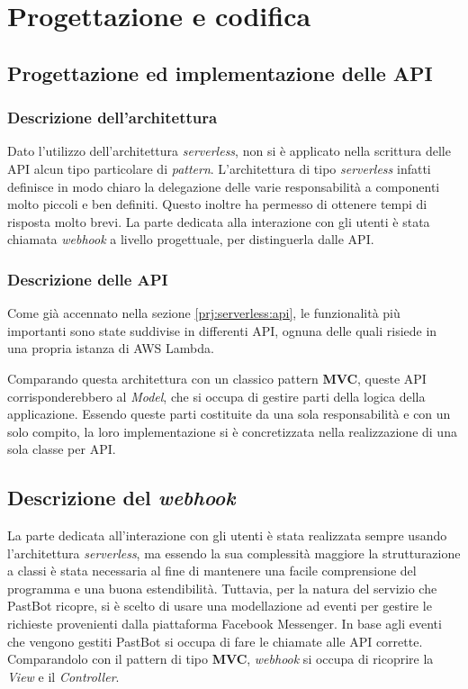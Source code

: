 
%
%

\chapter{Progettazione e codifica}

\section{Progettazione ed implementazione delle API}

\subsection{Descrizione dell'architettura}

Dato l'utilizzo dell'architettura \textit{serverless}, non si è applicato nella
scrittura delle API alcun tipo particolare di \textit{pattern}. L'architettura
di tipo \textit{serverless} infatti definisce in modo chiaro la delegazione
delle varie responsabilità a componenti molto piccoli e ben definiti. Questo
inoltre ha permesso di ottenere tempi di risposta molto brevi.
La parte dedicata alla interazione con gli utenti è stata chiamata
\textit{webhook} a livello progettuale, per distinguerla dalle API.

\subsection{Descrizione delle API}
Come già accennato nella sezione \ref{prj:serverless:api}, le funzionalità più
importanti sono state suddivise in differenti API, ognuna delle quali risiede
in una propria istanza di AWS Lambda.

Comparando questa architettura con un classico pattern \textbf{MVC}, queste API
corrisponderebbero al \textit{Model}, che si occupa di gestire parti della
logica della applicazione. Essendo queste parti costituite da una sola
responsabilità e con un solo compito, la loro implementazione si è
concretizzata nella realizzazione di una sola classe per API.

\section{Descrizione del \textit{webhook}}
La parte dedicata all'interazione con gli utenti è stata realizzata sempre
usando l'architettura \textit{serverless}, ma essendo la sua complessità
maggiore la strutturazione a classi è stata necessaria al fine di mantenere una
facile comprensione del programma e una buona estendibilità. Tuttavia, per la
natura del servizio che PastBot ricopre, si è scelto di usare una modellazione
ad eventi per gestire le richieste provenienti dalla piattaforma Facebook
Messenger. In base agli eventi che vengono gestiti PastBot si occupa di fare le
chiamate alle API corrette. Comparandolo con il pattern di tipo \textbf{MVC},
\textit{webhook} si occupa di ricoprire la \textit{View} e il
\textit{Controller}.

